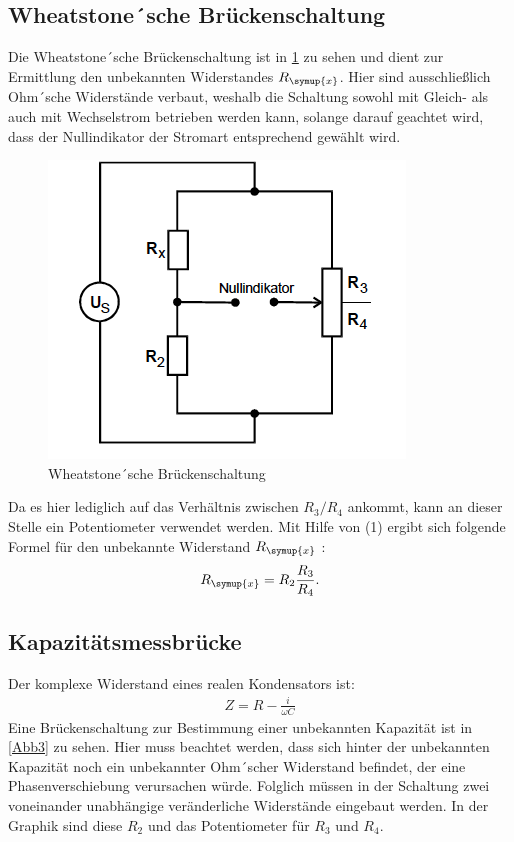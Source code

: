 \subsection{Wheatstone´sche Brückenschaltung}
Die Wheatstone´sche Brückenschaltung ist in \ref{Abb2} zu sehen und dient zur
Ermittlung den unbekannten Widerstandes $R_\symup{x}$. Hier sind ausschließlich Ohm´sche
Widerstände verbaut, weshalb die Schaltung sowohl mit Gleich- als auch mit
Wechselstrom betrieben werden kann, solange darauf geachtet wird, dass der Nullindikator
der Stromart entsprechend gewählt wird.

\begin{figure}
  \centering
  \includegraphics[scale=0.7]{Wheat.PNG}
  \caption{Wheatstone´sche Brückenschaltung \cite{Quelle}}
  \label{Abb2}
\end{figure}
\FloatBarrier

\noindent Da es hier lediglich auf das Verhältnis zwischen $R_3 / R_4$ ankommt, kann
an dieser Stelle ein Potentiometer verwendet werden.
Mit Hilfe von (1) ergibt sich folgende Formel für den unbekannte Widerstand
$R_\symup{x}$ :
\begin{align*}
  R_\symup{x} = R_2 \frac{R_3}{R_4} .
\end{align*}

\subsection{Kapazitätsmessbrücke}
Der komplexe Widerstand eines realen Kondensators ist:
\begin{align*}
  Z = R - \frac{i}{\omega C}
\end{align*}
Eine Brückenschaltung zur Bestimmung einer unbekannten Kapazität ist in \ref{Abb3}
zu sehen. Hier muss beachtet werden, dass sich hinter der unbekannten Kapazität
noch ein unbekannter Ohm´scher Widerstand befindet, der eine Phasenverschiebung
verursachen würde. Folglich müssen in der Schaltung zwei voneinander unabhängige
veränderliche Widerstände eingebaut werden. In der Graphik sind diese $R_2$ und das
Potentiometer für $R_3$ und $R_4$.
\FloatBarrier

